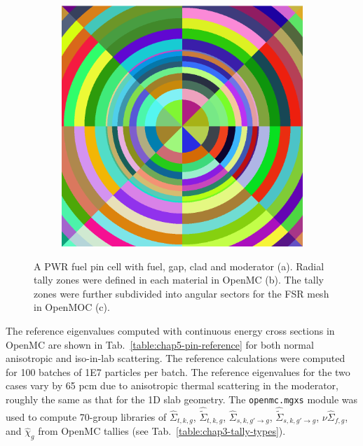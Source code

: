 \begin{figure}[H]
\begin{subfigure}{.32\textwidth}
  \caption{}
  \label{fig:chap5-pin-b}
\end{subfigure}
\begin{subfigure}{.32\textwidth}
  \centering
  \includegraphics[width=0.9\linewidth]{figures/biases/pin-cell/pin-cell-8x8}
  \caption{}
  \label{fig:chap5-pin-c}
\end{subfigure}
\caption[Pin cell materials and geometry]{A PWR fuel pin cell with fuel, gap, clad and moderator (a). Radial tally zones were defined in each material in OpenMC (b). The tally zones were further subdivided into angular sectors for the \ac{FSR} mesh in OpenMOC (c).}
\label{fig:chap5-pin-cell}
\end{figure}

The reference eigenvalues computed with continuous energy cross sections in OpenMC are shown in Tab.~\ref{table:chap5-pin-reference} for both normal anisotropic and iso-in-lab scattering. The reference calculations were computed for 100 batches of 1E7 particles per batch. The reference eigenvalues for the two cases vary by 65 \ac{pcm} due to anisotropic thermal scattering in the moderator, roughly the same as that for the 1D slab geometry. The \texttt{openmc.mgxs} module was used to compute 70-group libraries of $\hat{\Sigma}_{t,k,g}$, $\hat{\tilde{\Sigma}}_{t,k,g}$, $\hat{\Sigma}_{s,k,g'\rightarrow g}$, $\hat{\tilde{\Sigma}}_{s,k,g'\rightarrow g}$, $\nu\hat{\Sigma}_{f,g}$, and $\hat{\chi}_{g}$ from OpenMC tallies (see Tab.~\ref{table:chap3-tally-types}). 

